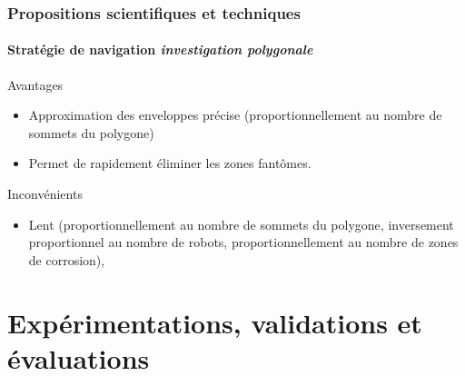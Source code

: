 \documentclass{beamer}
\begin{document}
			\begin{frame}
				\frametitle{Propositions scientifiques et techniques}
				\framesubtitle{Stratégie de navigation \textit{investigation polygonale}}
				\begin{exampleblock}{Avantages}
					\begin{itemize}
						\item Approximation des enveloppes précise (proportionnellement au nombre de sommets du polygone)
						\item Permet de rapidement éliminer les zones fantômes.
					\end{itemize}
				\end{exampleblock}
				\begin{alertblock}{Inconvénients}
					\begin{itemize}
						\item Lent (proportionnellement au nombre de sommets du polygone, inversement proportionnel au nombre de robots, proportionnellement au nombre de zones de corrosion),
					\end{itemize}
				\end{alertblock}
			\end{frame}
	\section{Expérimentations, validations et évaluations}
\end{document}
